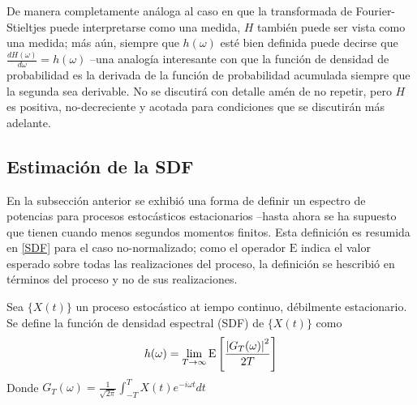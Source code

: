 De manera completamente an\'aloga al caso en que la transformada de Fourier-Stieltjes puede
interpretarse como una medida, $H$ tambi\'en puede ser vista como una medida; m\'as a\'un,
siempre que $h(\omega)$ est\'e bien definida puede decirse que 
$\frac{dH(\omega)}{d\omega}= h(\omega)$ --una analog\'ia interesante con que la funci\'on
de densidad de probabilidad es la derivada de la funci\'on de probabilidad acumulada siempre
que la segunda sea derivable.
No se discutir\'a con detalle am\'en de no repetir, pero $H$ es positiva, no-decreciente y
acotada para condiciones que se discutir\'an m\'as adelante.


\subsection{Estimaci\'on de la SDF}

En la subsecci\'on anterior se exhibi\'o una forma de definir un espectro de potencias para 
procesos estoc\'asticos estacionarios --hasta ahora se ha supuesto que tienen cuando menos
segundos momentos finitos. Esta definici\'on es resumida en \ref{SDF} para el caso no-normalizado;
como el operador $\mathrm{E}$ indica el valor esperado sobre todas las realizaciones del proceso,
la definici\'on se hescribi\'o en t\'erminos del proceso y no de sus realizaciones.

\begin{defn}
Sea $\{X(t)\}$ un proceso estoc\'astico at iempo continuo, d\'ebilmente estacionario. Se define
la funci\'on de densidad espectral (SDF) de $\{X(t)\}$ como
\begin{equation*}
h(\omega) = \lim_{T\rightarrow \infty} \mathrm{E}\left[  \frac{ \left| G_T(\omega) \right|^{2}}{2 T}  \right]
\end{equation*}
Donde $G_T (\omega) = \frac{1}{\sqrt{2 \pi}} \int_{-T}^{T} X(t) e^{-i \omega t} dt$
\label{SDF}
\end{defn}



